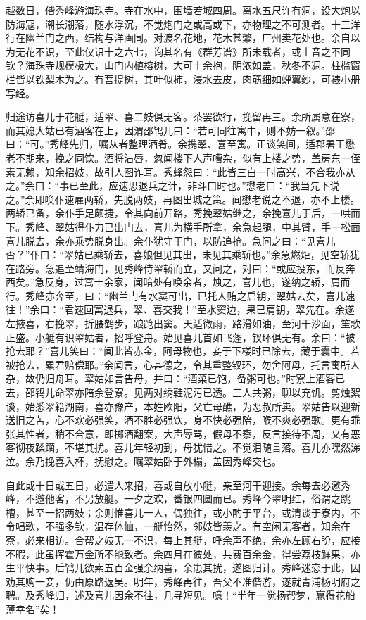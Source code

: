 \documentclass[]{article}
\begin{document}
越数日，偕秀峰游海珠寺。寺在水中，围墙若城四周。离水五尺许有洞，设大炮以防海寇，潮长潮落，随水浮沉，不觉炮门之或高或下，亦物理之不可测者。十三洋行在幽兰门之西，结构与洋画同。对渡名花地，花木甚繁，广州卖花处也。余自以为无花不识，至此仅识十之六七，询其名有《群芳谱》所未载者，或土音之不同钦？海珠寺规模极大，山门内植榕树，大可十余抱，阴浓如盖，秋冬不凋。柱槛窗栏皆以铁梨木为之。有菩提树，其叶似柿，浸水去皮，肉筋细如蝉翼纱，可裱小册写经。

归途访喜儿于花艇，适翠、喜二妓俱无客。茶罢欲行，挽留再三。余所属意在寮，而其媳大姑已有酒客在上，因渭邵鸨儿曰：``若可同往寓中，则不妨一叙。''邵曰：``可。''秀峰先归，嘱从者整理酒肴。余携翠、喜至寓。正谈笑间，适郡署王懋老不期来，挽之同饮。酒将沾唇，忽闻楼下人声嘈杂，似有上楼之势，盖房东一侄素无赖，知余招妓，故引人图诈耳。秀蜂怨曰：``此皆三白一时高兴，不合我亦从之。''余曰：``事已至此，应速思退兵之计，非斗口时也。''懋老曰：``我当先下说之。''余即唤仆速雇两轿，先脱两妓，再图出城之策。闻懋老说之不退，亦不上楼。两轿已备，余仆手足颇捷，令其向前开路，秀挽翠姑继之，余挽喜儿于后，一哄而下。秀峰、翠姑得仆力已出门去，喜儿为横手所拿，余急起腿，中其臂，手一松面喜儿脱去，余亦乘势脱身出。余仆犹守于门，以防追抢。急问之曰：``见喜儿否？''仆曰：``翠姑已乘轿去，喜娘但见其出，未见其乘轿也。''余急燃炬，见空轿犹在路旁。急追至靖海门，见秀峰侍翠轿而立，又问之，对曰：``或应投东，而反奔西矣。''急反身，过寓十余家，闻暗处有唤余者，烛之，喜儿也，遂纳之轿，肩而行。秀峰亦奔至，曰：``幽兰门有水窦可出，已托人贿之启钥，翠姑去矣，喜儿速往！''余曰：``君速回寓退兵，翠、喜交我！''至水窦边，果已肩钥，翠先在。余遂左掖喜，右挽翠，折腰鹤步，踉跄出窦。天适微雨，路滑如油，至河干沙面，笙歌正盛。小艇有识翠姑者，招呼登舟。始见喜儿首如飞蓬，钗环俱无有。余曰：``被抢去耶？''喜儿笑曰：``闻此皆赤金，阿母物也，妾于下楼时已除去，藏于囊中。若被抢去，累君赔偿耶。''余闻言，心甚德之，令其重整钗环，勿舍阿母，托言寓所人杂，故仍归舟耳。翠姑如言告母，并曰：``酒菜已饱，备粥可也。''时寮上酒客已去，邵鸨儿命翠亦陪余登寮。见两对绣鞋泥污已透。三人共粥，聊以充饥。剪烛絮谈，始悉翠籍湖南，喜亦豫产，本姓欧阳，父亡母醮，为恶叔所卖。翠姑告以迎新送旧之苦，心不欢必强笑，酒不胜必强饮，身不快必强陪，喉不爽必强歌。更有乖张其性者，稍不合意，即掷酒翻案，大声辱骂，假母不察，反言接待不周，又有恶客彻夜蹂躏，不堪其扰。喜儿年轻初到，母犹惜之。不觉泪随言落。喜儿亦嘿然涕泣。余乃挽喜入杯，抚慰之。瞩翠姑卧于外榻，盖因秀峰交也。

自此或十日或五日，必遣人来招，喜或自放小艇，亲至河干迎接。余每去必邀秀峰，不邀他客，不另放艇。一夕之欢，番银四圆而已。秀峰今翠明红，俗谓之跳槽，甚至一招两妓；余则惟喜儿一人，偶独往，或小酌于平台，或清谈于寮内，不令唱歌，不强多钦，温存体恤，一艇怡然，邻妓皆羡之。有空闲无客者，知余在寮，必来相访。合帮之妓无一不识，每上其艇，呼余声不绝，余亦左顾右盼，应接不暇，此虽挥霍万金所不能致者。余四月在彼处，共费百余金，得尝荔枝鲜果，亦生平快事。后鸨儿欲索五百金强余纳喜，余患其扰，遂图归计。秀峰迷恋于此，因劝其购一妾，仍由原路返吴。明年，秀峰再往，吾父不准偕游，遂就青浦杨明府之聘。及秀峰归，述及喜儿因余不往，几寻短见。噫！``半年一觉扬帮梦，赢得花船薄幸名''矣！
\end{document}
